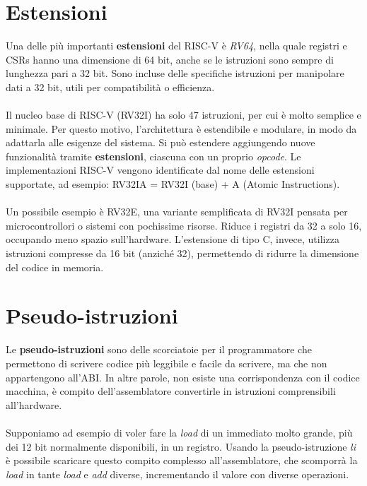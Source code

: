 \section{Estensioni}
Una delle più importanti \textbf{estensioni} del RISC-V è \textit{RV64}, nella quale registri e CSRs hanno una dimensione di 64 bit, anche se le istruzioni sono sempre di lunghezza pari a 32 bit. Sono incluse delle specifiche istruzioni per manipolare dati a 32 bit, utili per compatibilità o efficienza.
\\
\\
Il nucleo base di RISC-V (RV32I) ha solo 47 istruzioni, per cui è molto semplice e minimale. Per questo motivo, l'architettura è estendibile e modulare, in modo da adattarla alle esigenze del sistema. Si può estendere aggiungendo nuove funzionalità tramite \textbf{estensioni}, ciascuna con un proprio \textit{opcode}. Le implementazioni RISC-V vengono identificate dal nome delle estensioni supportate, ad esempio: RV32IA = RV32I (base) + A (Atomic Instructions).
\\
\\
Un possibile esempio è RV32E, una variante semplificata di RV32I pensata per microcontrollori o sistemi con pochissime risorse. Riduce i registri da 32 a solo 16, occupando meno spazio sull’hardware. L'estensione di tipo C, invece, utilizza istruzioni compresse da 16 bit (anziché 32), permettendo di ridurre la dimensione del codice in memoria.

\section{Pseudo-istruzioni}
Le \textbf{pseudo-istruzioni} sono delle scorciatoie per il programmatore che permettono di scrivere codice più leggibile e facile da scrivere, ma che non appartengono all'ABI. In altre parole, non esiste una corrispondenza con il codice macchina, è compito dell'assemblatore convertirle in istruzioni comprensibili all'hardware.
\\
\\
Supponiamo ad esempio di voler fare la \textit{load} di un immediato molto grande, più dei 12 bit normalmente disponibili, in un registro. Usando la pseudo-istruzione \textit{li} è possibile scaricare questo compito complesso all'assemblatore, che scomporrà la \textit{load} in tante \textit{load} e \textit{add} diverse, incrementando il valore con diverse operazioni.

